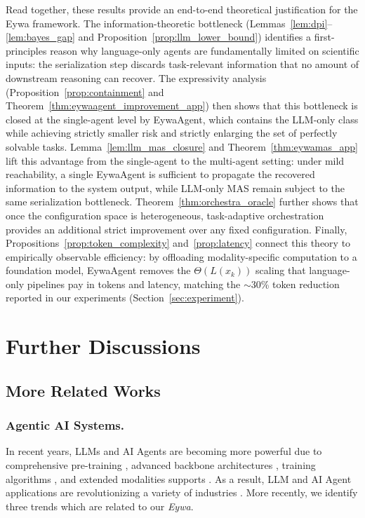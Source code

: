 \documentclass{llmxive}
\begin{document}
{Read together, these results provide an end-to-end theoretical justification for the Eywa framework. The information-theoretic bottleneck (Lemmas~\ref{lem:dpi}--\ref{lem:bayes_gap} and Proposition~\ref{prop:llm_lower_bound}) identifies a first-principles reason why language-only agents are fundamentally limited on scientific inputs: the serialization step discards task-relevant information that no amount of downstream reasoning can recover. The expressivity analysis (Proposition~\ref{prop:containment} and Theorem~\ref{thm:eywaagent_improvement_app}) then shows that this bottleneck is closed at the single-agent level by EywaAgent, which contains the LLM-only class while achieving strictly smaller risk and strictly enlarging the set of perfectly solvable tasks. Lemma~\ref{lem:llm_mas_closure} and Theorem~\ref{thm:eywamas_app} lift this advantage from the single-agent to the multi-agent setting: under mild reachability, a single EywaAgent is sufficient to propagate the recovered information to the system output, while LLM-only MAS remain subject to the same serialization bottleneck. Theorem~\ref{thm:orchestra_oracle} further shows that once the configuration space is heterogeneous, task-adaptive orchestration provides an additional strict improvement over any fixed configuration. Finally, Propositions~\ref{prop:token_complexity} and~\ref{prop:latency} connect this theory to empirically observable efficiency: by offloading modality-specific computation to a foundation model, EywaAgent removes the $\Theta(L(x_k))$ scaling that language-only pipelines pay in tokens and latency, matching the $\sim$30\% token reduction reported in our experiments (Section~\ref{sec:experiment}).




\section{Further Discussions}
\label{app:further_discussion}

\subsection{More Related Works}
\label{ap:related_work}


\subsubsection{Agentic AI Systems.} 
In recent years, LLMs and AI Agents are becoming more powerful due to comprehensive pre-training \cite{DBLP:journals/corr/abs-2601-03267}, advanced backbone architectures \cite{DBLP:journals/corr/abs-2505-06708, DBLP:journals/corr/abs-2510-26692}, training algorithms \cite{DBLP:journals/corr/abs-2501-12948}, and extended modalities supports \cite{DBLP:journals/corr/abs-2603-03276, DBLP:journals/corr/abs-2505-07062, DBLP:journals/corr/abs-2509-17765}. As a result, LLM and AI Agent applications are revolutionizing a variety of industries \cite{DBLP:journals/corr/abs-2503-21460}. More recently, we identify three trends which are related to our \textit{Eywa}.

}
\end{document}
